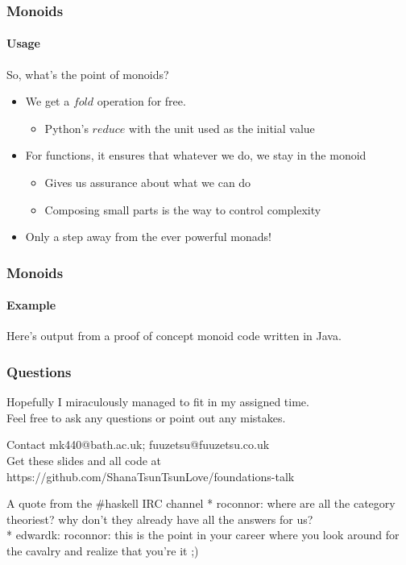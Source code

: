 \documentclass{beamer}
\begin{document}
\begin{frame}
  \frametitle{Monoids}
  \framesubtitle{Usage}
  So, what's the point of monoids?
  \pause
  \begin{itemize}[<+->]
    \item We get a $fold$ operation for free.
      \begin{itemize}
        \item Python's $reduce$ with the unit used as the initial
          value
      \end{itemize}
    \item For functions, it ensures that whatever we do, we stay in
      the monoid
      \begin{itemize}
        \item Gives us assurance about what we can do
        \item Composing small parts is the way to control complexity
      \end{itemize}
    \item Only a step away from the ever powerful monads!
  \end{itemize}
\end{frame}
\begin{frame}
  \frametitle{Monoids}
  \framesubtitle{Example}
  Here's output from a proof of concept monoid code written in Java.
 
\end{frame}
\begin{frame}
  \frametitle{Questions}
  Hopefully I miraculously managed to fit in my assigned time.\\
  Feel free to ask any questions or point out any mistakes.
  \begin{block}{Contact}
    mk440@bath.ac.uk; fuuzetsu@fuuzetsu.co.uk\\
    Get these slides and all code at
    https://github.com/ShanaTsunTsunLove/foundations-talk
  \end{block}
  \begin{block}{A quote from the \#haskell IRC channel}
    * roconnor: where are all the category theoriest? why don't they
    already have all the answers for us?\\
    * edwardk: roconnor: this is the point in your career where you look
    around for the cavalry and realize that you're it ;)
  \end{block}
\end{frame}
\end{document}
